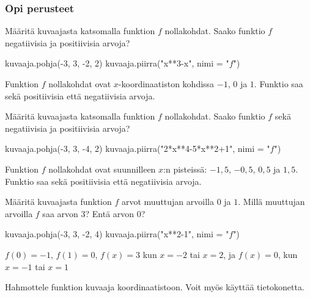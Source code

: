 \begin{tehtavasivu}


\subsubsection*{Opi perusteet}
\begin{tehtava}
Määritä kuvaajasta katsomalla funktion $f$ nollakohdat. Saako funktio $f$ negatiivisia ja positiivisia arvoja?
\begin{kuva}
    kuvaaja.pohja(-3, 3, -2, 2)
    kuvaaja.piirra("x**3-x", nimi = "$f$")
\end{kuva}
\begin{vastaus}
Funktion $f$ nollakohdat ovat $x$-koordinaatiston kohdissa $-1$, $0$ ja $1$. Funktio saa sekä positiivisia että negatiivisia arvoja.
\end{vastaus}
\end{tehtava}

\begin{tehtava}
Määritä kuvaajasta katsomalla funktion $f$ nollakohdat. Saako funktio $f$ sekä negatiivisia ja positiivisia arvoja?
\begin{kuva}
    kuvaaja.pohja(-3, 3, -4, 2)
    kuvaaja.piirra("2*x**4-5*x**2+1", nimi = "$f$")
\end{kuva}
\begin{vastaus}
Funktion $f$ nollakohdat ovat suunnilleen $x$:n pisteissä: $-1,5$, $-0,5$, $0,5$ ja $1,5$. Funktio saa sekä positiivisia että negatiivisia arvoja.
\end{vastaus}
\end{tehtava}

\begin{tehtava}
Määritä kuvaajasta funktion $f$ arvot muuttujan arvoilla $0$ ja $1$. Millä muuttujan arvoilla $f$ saa arvon $3$? Entä arvon $0$?
\begin{kuva}
    kuvaaja.pohja(-3, 3, -2, 4)
    kuvaaja.piirra("x**2-1", nimi = "$f$")
\end{kuva}
\begin{vastaus}
 $f(0)=-1$, $f(1)=0$, $f(x)=3$ kun $x=-2$ tai $x=2$, ja $f(x)=0$, kun $x=-1$ tai $x=1$
\end{vastaus}
\end{tehtava}


\begin{tehtava}
Hahmottele funktion kuvaaja koordinaatistoon. Voit myös käyttää tietokonetta.
\end{tehtava} %


\end{tehtavasivu}
